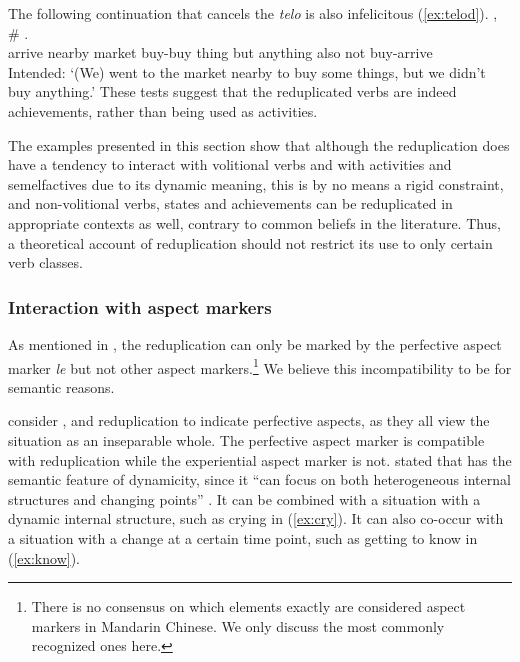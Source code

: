 \z\z
The following continuation that cancels the \textit{telo} is also infelicitous (\ref{ex:telod}).
\ea\label{ex:telod} %
\gll {}    , \#     .\\
arrive nearby market buy-buy thing {} but anything also not buy-arrive\\
\glt Intended: `(We) went to the market nearby to buy some things, but we didn't buy anything.'
\z
These tests suggest that the reduplicated verbs are indeed achievements,
rather than being used as activities.

The examples presented in this section show that although the reduplication does have a tendency to interact with volitional verbs and with activities and semelfactives due to its dynamic meaning, 
this is by no means a rigid constraint, 
and non\hyp{}volitional verbs, states and achievements can be reduplicated in appropriate contexts as well,
 contrary to common beliefs in the literature.
Thus, a theoretical account of reduplication should not restrict its use to only certain verb classes.




\subsubsection{Interaction with aspect markers}\label{sec:aspM}

As mentioned in , the reduplication can only be marked by the perfective aspect marker \textit{le} but not other aspect markers.\footnote{
There is no consensus on which elements exactly are considered aspect markers in Mandarin Chinese. 
We only discuss the most commonly recognized ones here.
}
We believe this incompatibility to be for semantic reasons.

\citet[Ch. 4]{XiaoMcEnery2004} consider ,  and reduplication to indicate perfective aspects, as they all view the situation as an inseparable whole.
The perfective aspect marker  is compatible with reduplication while the experiential aspect marker  is not.
\citet[128--131]{XiaoMcEnery2004} stated that  has the semantic feature of dynamicity, since it ``can focus on both heterogeneous internal structures and changing points'' \citep[129]{XiaoMcEnery2004}.
It can be combined with a situation with a dynamic internal structure, such as crying in (\ref{ex:cry}).
It can also co\hyp{}occur with a situation with a change at a certain time point, such as getting to know in (\ref{ex:know}).

